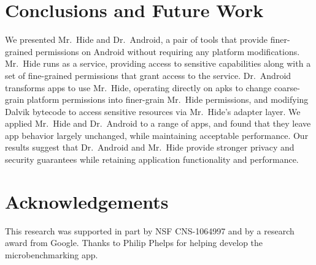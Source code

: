 \documentclass[preprint]{sig-alternate-10pt}
\newcommand{\lib}{Mr.\ Hide\xspace}
\newcommand{\rewriter}{Dr.\ Android\xspace}
\newcommand{\comment}[3][\color{red}]{}%
\newcommand{\jsjeon}[1]{\comment[\color{red}]{JJ}{#1}}
\begin{document}


\section{Conclusions and Future Work}

We presented \lib and \rewriter, a pair of tools that provide
finer-grained permissions on Android without requiring any platform
modifications. \lib runs as a service, providing access to sensitive
capabilities along with a set of fine-grained permissions that grant access
to the service. \rewriter transforms apps to use \lib, operating
directly on apks to change coarse-grain platform permissions into
finer-grain \lib permissions, and modifying Dalvik bytecode to access
sensitive resources via \lib's adapter layer. We applied \lib and
\rewriter to a range of apps, and found that they leave app behavior
largely unchanged, while maintaining acceptable performance. Our
results suggest that \rewriter and \lib provide stronger privacy and
security guarantees while retaining application functionality and
performance.


\section*{Acknowledgements}

This research was supported in part by NSF CNS-1064997 and by a
research award from Google. Thanks to Philip Phelps for helping
develop the microbenchmarking app.



\end{document}
